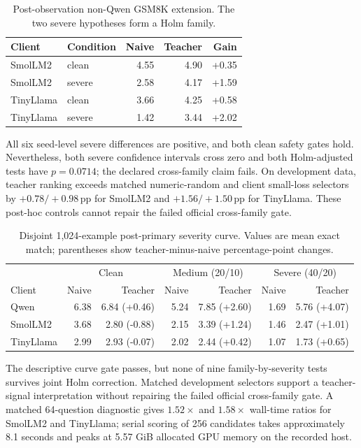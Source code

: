\documentclass[letterpaper]{article}
\newcommand{\pp}{\,\mathrm{pp}}
\begin{document}
\begin{table}[ht]
\centering
\small
\begin{tabular}{llrrr}
\toprule
Client & Condition & Naive & Teacher & Gain\\
\midrule
SmolLM2 & clean  & 4.55 & 4.90 & +0.35\\
SmolLM2 & severe & 2.58 & 4.17 & +1.59\\
TinyLlama & clean  & 3.66 & 4.25 & +0.58\\
TinyLlama & severe & 1.42 & 3.44 & +2.02\\
\bottomrule
\end{tabular}
\caption{Post-observation non-Qwen GSM8K extension.  The two severe hypotheses
form a Holm family.}
\end{table}

All six seed-level severe differences are positive, and both clean safety
gates hold.  Nevertheless, both severe confidence intervals cross zero and
both Holm-adjusted tests have \(p=0.0714\); the declared cross-family claim fails.
On development data, teacher ranking exceeds matched numeric-random and client
small-loss selectors by \(+0.78/+0.98\pp\) for SmolLM2 and
\(+1.56/+1.50\pp\) for TinyLlama.  These post-hoc controls cannot repair the
failed official cross-family gate.

\begin{table}[t]
\centering
\small
\begin{tabular}{lrrrrrr}
\toprule
& \multicolumn{2}{c}{Clean} & \multicolumn{2}{c}{Medium (20/10)}
& \multicolumn{2}{c}{Severe (40/20)}\\
Client & Naive & Teacher & Naive & Teacher & Naive & Teacher\\
\midrule
Qwen & 6.38 & 6.84 (+0.46) & 5.24 & 7.85 (+2.60) & 1.69 & 5.76 (+4.07)\\
SmolLM2 & 3.68 & 2.80 (-0.88) & 2.15 & 3.39 (+1.24) & 1.46 & 2.47 (+1.01)\\
TinyLlama & 2.99 & 2.93 (-0.07) & 2.02 & 2.44 (+0.42) & 1.07 & 1.73 (+0.65)\\
\bottomrule
\end{tabular}
\caption{Disjoint 1,024-example post-primary severity curve.  Values are mean
exact match; parentheses show teacher-minus-naive percentage-point changes.}
\end{table}

The descriptive curve gate passes, but none of nine family-by-severity tests
survives joint Holm correction.  Matched development selectors support a
teacher-signal interpretation without repairing the failed official
cross-family gate.  A matched 64-question diagnostic gives $1.52\times$ and
$1.58\times$ wall-time ratios for SmolLM2 and TinyLlama; serial scoring of 256
candidates takes approximately 8.1 seconds and peaks at 5.57 GiB allocated GPU
memory on the recorded host.
\end{document}
